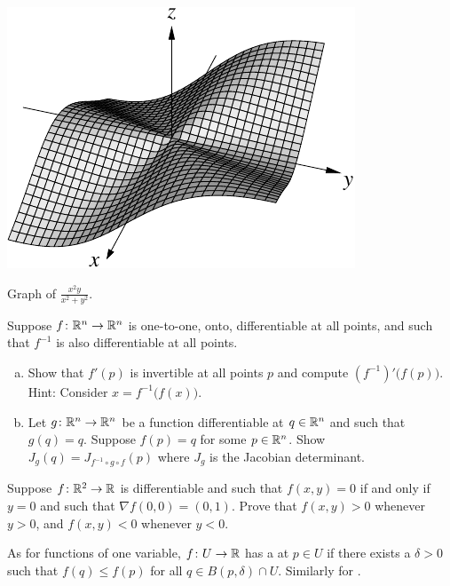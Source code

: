 \begin{myfigureht}
\includegraphics{figures/xsqyxsqysq}
\caption{Graph of $\frac{x^2y}{x^2+y^2}$.\label{fig:xsqyxsqysq}}
\end{myfigureht}

\begin{samepage}
\begin{exercise}
Suppose $f \colon {\mathbb{R}}^n \to {\mathbb{R}}^n$ is one-to-one, onto, differentiable at all
points, and such that $f^{-1}$ is also differentiable at all points.
\begin{enumerate}[a)]
\item
Show that $f'(p)$ is invertible at all points $p$ and compute
${(f^{-1})}'\bigl(f(p)\bigr)$.  Hint: Consider $x = f^{-1}\bigl(f(x)\bigr)$.
\item
Let $g \colon {\mathbb{R}}^n \to {\mathbb{R}}^n$ be a function differentiable at $q \in {\mathbb{R}}^n$
and such that $g(q)=q$.  Suppose $f(p) = q$ for some $p \in {\mathbb{R}}^n$.
Show $J_g(q) = J_{f^{-1} \circ g \circ f}(p)$ where $J_g$ is the Jacobian
determinant.
\end{enumerate}
\end{exercise}
\end{samepage}

\begin{exercise}
Suppose $f \colon {\mathbb{R}}^2 \to {\mathbb{R}}$ is differentiable and such that
$f(x,y) = 0$ if and only if $y=0$ and such that $\nabla f(0,0) = (0,1)$.
Prove that $f(x,y) > 0$ whenever $y > 0$, and
$f(x,y) < 0$ whenever $y < 0$.
\end{exercise}

\begin{exnote}
As for functions of one variable, $f \colon U \to {\mathbb{R}}$ has a
\emph{} at $p \in U$ if there exists
a $\delta >0$ such that $f(q) \leq f(p)$ for all $q \in B(p,\delta) \cap U$.
Similarly for \emph{}.
\end{exnote}

